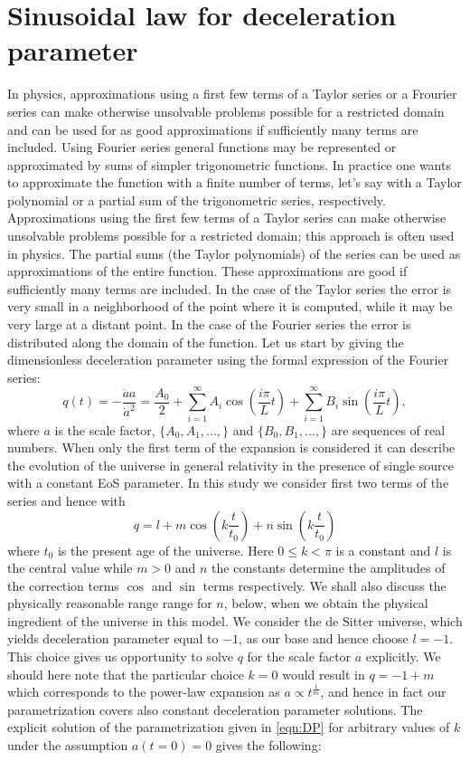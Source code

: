 \documentclass[11pt,a4paper]{article}
\begin{document}
 \section{Sinusoidal law for deceleration parameter}
\label{sec:cosine_law}

In physics, approximations using a first few terms of a Taylor series or a Frourier series can make otherwise unsolvable problems possible for a restricted domain and can be used for as good approximations if sufficiently many terms are included. Using Fourier series general functions may be represented or approximated by sums of simpler trigonometric functions. In practice one wants to approximate the function with a finite number of terms, let's say with a Taylor polynomial or a partial sum of the trigonometric series, respectively. Approximations using the first few terms of a Taylor series can make otherwise unsolvable problems possible for a restricted domain; this approach is often used in physics. The partial sums (the Taylor polynomials) of the series can be used as approximations of the entire function. These approximations are good if sufficiently many terms are included. In the case of the Taylor series the error is very small in a neighborhood of the point where it is computed, while it may be very large at a distant point. In the case of the Fourier series the error is distributed along the domain of the function. Let us start by giving the dimensionless deceleration parameter using the formal expression of the Fourier series:
\begin{equation}
q(t)=-\frac{\ddot{a}a}{{\dot{a}}^2}=\frac{A_{0}}{2}+\sum_{i=1}^{\infty} A_{i}\cos\left(\frac{i\pi}{L}t\right)+\sum_{i=1}^{\infty} B_{i}\sin\left(\frac{i \pi}{L}t\right),
\end{equation}
where $a$ is the scale factor, $\{A_0,A_{1},..., \}$ and $\{B_0,B_{1},..., \}$ are sequences of real numbers. When only the first term of the expansion is considered it can describe the evolution of the universe in general relativity in the presence of single source with a constant EoS parameter. In this study we consider first two terms of the series and hence with
\begin{equation}\label{eqn:DP}
q=l+m \cos{\left(k\frac{t}{t_{0}}\right)}+n \sin{\left(k\frac{t}{t_{0}}\right)}
\end{equation}
where $t_{0}$ is the present age of the universe. Here $0\leq k< \pi$ is a constant and $l$ is the central value while $m>0$ and $n$ the constants determine the amplitudes of the correction terms $\cos$ and $\sin$ terms respectively. We shall also discuss the physically reasonable range range for $n$, below, when we obtain the physical ingredient of the universe in this model. We consider the de Sitter universe, which yields deceleration parameter equal to $-1$, as our base and hence choose $l=-1$. This choice gives us opportunity to solve $q$ for the scale factor $a$ explicitly. We should here note that the particular choice $k=0$ would result in $q=-1+m$ which corresponds to the power-law expansion as $a\propto t^{\frac{1}{m}}$, and hence in fact our parametrization covers also constant deceleration parameter solutions. The explicit solution of the parametrization given in \eqref{eqn:DP} for arbitrary values of $k$ under the assumption $a(t=0)=0$ gives the following:
\end{document}
